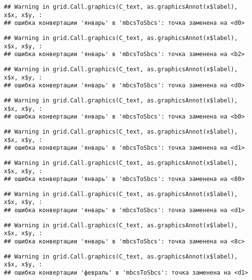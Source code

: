 \documentclass[
]{article}
\begin{document}
\begin{verbatim}
## Warning in grid.Call.graphics(C_text, as.graphicsAnnot(x$label), x$x, x$y, :
## ошибка конвертации 'январь' в 'mbcsToSbcs': точка заменена на <d0>
\end{verbatim}

\begin{verbatim}
## Warning in grid.Call.graphics(C_text, as.graphicsAnnot(x$label), x$x, x$y, :
## ошибка конвертации 'январь' в 'mbcsToSbcs': точка заменена на <b2>
\end{verbatim}

\begin{verbatim}
## Warning in grid.Call.graphics(C_text, as.graphicsAnnot(x$label), x$x, x$y, :
## ошибка конвертации 'январь' в 'mbcsToSbcs': точка заменена на <d0>
\end{verbatim}

\begin{verbatim}
## Warning in grid.Call.graphics(C_text, as.graphicsAnnot(x$label), x$x, x$y, :
## ошибка конвертации 'январь' в 'mbcsToSbcs': точка заменена на <b0>
\end{verbatim}

\begin{verbatim}
## Warning in grid.Call.graphics(C_text, as.graphicsAnnot(x$label), x$x, x$y, :
## ошибка конвертации 'январь' в 'mbcsToSbcs': точка заменена на <d1>
\end{verbatim}

\begin{verbatim}
## Warning in grid.Call.graphics(C_text, as.graphicsAnnot(x$label), x$x, x$y, :
## ошибка конвертации 'январь' в 'mbcsToSbcs': точка заменена на <80>
\end{verbatim}

\begin{verbatim}
## Warning in grid.Call.graphics(C_text, as.graphicsAnnot(x$label), x$x, x$y, :
## ошибка конвертации 'январь' в 'mbcsToSbcs': точка заменена на <d1>
\end{verbatim}

\begin{verbatim}
## Warning in grid.Call.graphics(C_text, as.graphicsAnnot(x$label), x$x, x$y, :
## ошибка конвертации 'январь' в 'mbcsToSbcs': точка заменена на <8c>
\end{verbatim}

\begin{verbatim}
## Warning in grid.Call.graphics(C_text, as.graphicsAnnot(x$label), x$x, x$y, :
## ошибка конвертации 'февраль' в 'mbcsToSbcs': точка заменена на <d1>
\end{verbatim}
\end{document}
